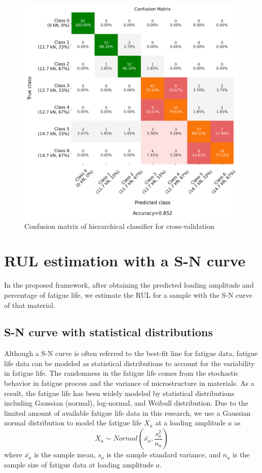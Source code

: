 \begin{figure}[tb]
    \includegraphics[width=\linewidth]{fig/hierarchical_confusion_matrix.png}
    \caption{Confusion matrix of hierarchical classifier for cross-validation}
    \label{fig: confu mat hier}
\end{figure}


\section{RUL estimation with a S-N curve}
In the proposed framework, after obtaining the predicted loading amplitude and percentage of fatigue life, we estimate the RUL for a sample with the S-N curve of that material.

\subsection{S-N curve with statistical distributions}
Although a S-N curve is often referred to the best-fit line for fatigue data, fatigue life data can be modeled as statistical distributions to account for the variability in fatigue life. The randomness in the fatigue life comes from the stochastic behavior in fatigue process and the variance of microstructure in materials. As a result, the fatigue life has been widely modeled by statistical distributions including Gaussian (normal), log-normal, and Weibull distribution. Due to the limited amount of available fatigue life data in this research, we use a Gaussian normal distribution to model the fatigue life $X_a$ at a loading amplitude $a$ as
\begin{equation}
    X_a \sim Normal(\bar{x_a}, \frac{s_a^2}{n_a})
\end{equation}
where $\bar{x_a}$ is the sample mean, $s_a$ is the sample standard variance, and $n_a$ is the sample size of fatigue data at loading amplitude $a$.

